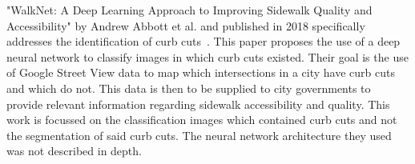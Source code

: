 "WalkNet: A Deep Learning Approach to Improving Sidewalk Quality and Accessibility" by Andrew Abbott et al. and published in 2018 specifically addresses the identification of curb cuts~\cite{walknet}.
This paper proposes the use of a deep neural network to classify images in which curb cuts existed.
Their goal is the use of Google Street View data to map which intersections in a city have curb cuts and which do not.
This data is then to be supplied to city governments to provide relevant information regarding sidewalk accessibility and quality.
This work is focussed on the classification images which contained curb cuts and not the segmentation of said curb cuts. The neural network architecture they used was not described in depth.
